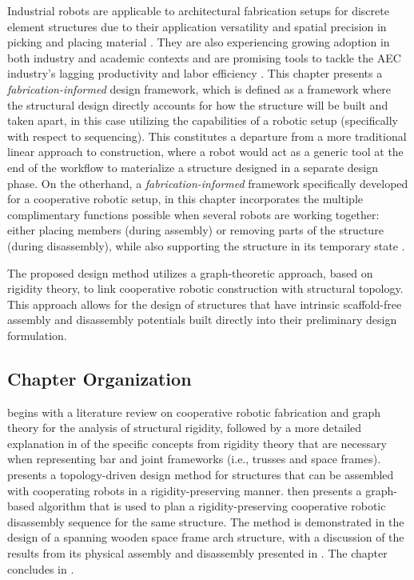     Industrial robots are applicable to architectural fabrication setups for discrete element structures due to their application versatility \citep{bravo-palacios_one_2020} and spatial precision in picking and placing material \citep{eversmann_robotic_2017}. They are also experiencing growing adoption in both industry and academic contexts \citep{ifr_world_2018} and are promising tools to tackle the AEC industry's lagging productivity and labor efficiency \citep{garcia_de_soto_productivity_2018, kumar_robotics_2016}. This chapter presents a \textit{fabrication-informed} design framework, which is defined as a framework where the structural design directly accounts for how the structure will be built and taken apart, in this case utilizing the capabilities of a robotic setup (specifically with respect to sequencing). This constitutes a departure from a more traditional linear approach to construction, where a robot would act as a generic tool at the end of the workflow to materialize a structure designed in a separate design phase. On the otherhand, a \textit{fabrication-informed} framework specifically developed for a cooperative robotic setup, in this chapter incorporates the multiple complimentary functions possible when several robots are working together: either placing members (during assembly) or removing parts of the structure (during disassembly), while also supporting the structure in its temporary state  \citep{parascho_cooperative_2019}.
    
    The proposed design method utilizes a graph-theoretic approach, based on rigidity theory, to link cooperative robotic construction with structural topology. This approach allows for the design of structures that have intrinsic scaffold-free assembly and disassembly potentials built directly into their preliminary design formulation.
    

\subsection{Chapter Organization}
     begins with a literature review on cooperative robotic fabrication and graph theory for the analysis of structural rigidity, followed by a more detailed explanation in  of the specific concepts from rigidity theory that are necessary when representing bar and joint frameworks (i.e., trusses and space frames).  presents a topology-driven design method for structures that can be assembled with cooperating robots in a rigidity-preserving manner.  then presents a graph-based algorithm that is used to plan a rigidity-preserving cooperative robotic disassembly sequence for the same structure. The method is demonstrated in the design of a spanning wooden space frame arch structure, with a discussion of the results from its physical assembly and disassembly presented in . The chapter concludes in .

